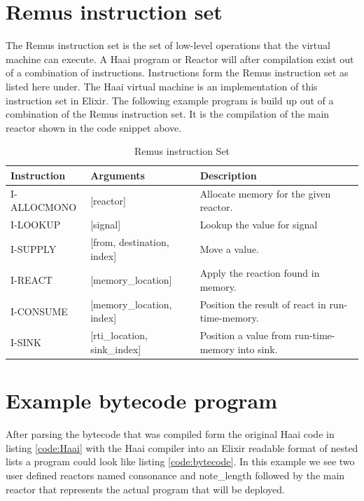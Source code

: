 \documentclass[a4paper]{book}
\begin{document}
\section{Remus instruction set}
The Remus instruction set is the set of low-level operations that the virtual machine can execute. A Haai program or Reactor will after compilation exist out of a combination of instructions. Instructions form the Remus instruction set as listed here under. The Haai virtual machine is an implementation of this instruction set in Elixir. The following example program is build up out of a combination of the Remus instruction set. It is the compilation of the main reactor shown in the code snippet above. 

\begin{table}[h!]
	\centering
	\begin{tabular}{@{}lll@{}}
		\toprule
		\textbf{Instruction} & \textbf{Arguments} & \textbf{Description} \\ \midrule
		I-ALLOCMONO & [reactor]  & Allocate memory for the given reactor. \\
		I-LOOKUP & [signal]  & Lookup the value for signal \\
		I-SUPPLY & [from, destination, index] &  Move a value.\\
		I-REACT  &[memory\_location] & Apply the reaction found in memory. \\
		I-CONSUME & [memory\_location, index] & Position the result of react in run-time-memory. \\
		I-SINK & [rti\_location, sink\_index]& Position a value from run-time-memory into sink. \\ 
		\toprule
	\end{tabular}
	\caption{Remus instruction Set}
	\label{tab:instructionset}
\end{table}

\section{Example bytecode program}

After parsing the bytecode that was compiled form the original Haai code in listing \ref{code:Haai} with the Haai compiler into an Elixir readable format of nested lists a program could look like listing \ref{code:bytecode}. In this example we see two user defined reactors named consonance and note\_length followed by the main reactor that represents the actual program that will be deployed. 

\begin{verbatim}

\end{verbatim}
\end{document}
